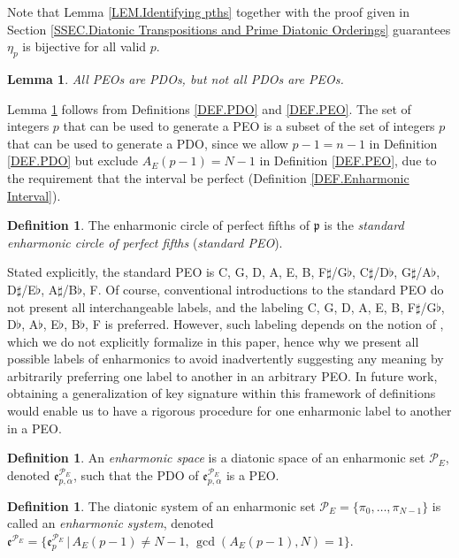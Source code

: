 \documentclass{article}
\theoremstyle{plain}
\newtheorem{lemma}[theorem]{Lemma}
\theoremstyle{definition}
\newtheorem{definition}[theorem]{Definition}
\theoremstyle{remark}
\begin{document}
Note that Lemma \ref{LEM.Identifying pths} together with the proof given in Section \ref{SSEC.Diatonic Transpositions and Prime Diatonic Orderings} guarantees $\eta_p$ is bijective for all valid $p$.

\begin{lemma}
\label{LEM.Not All PDOs are PEOs}
	All PEOs are PDOs, but not all PDOs are PEOs.
\end{lemma}

Lemma \ref{LEM.Not All PDOs are PEOs} follows from Definitions \ref{DEF.PDO} and \ref{DEF.PEO}. The set of integers $p$ that can be used to generate a PEO is a subset of the set of integers $p$ that can be used to generate a PDO, since we allow $p-1=n-1$ in Definition \ref{DEF.PDO} but exclude $A_E(p-1)=N-1$ in Definition \ref{DEF.PEO}, due to the requirement that the interval be perfect (Definition \ref{DEF.Enharmonic Interval}).

\begin{definition}
	The enharmonic circle of perfect fifths of $\mathfrak{p}$ is the \textit{standard enharmonic circle of perfect fifths} (\textit{standard PEO}).
\end{definition}

Stated explicitly, the standard PEO is C, G, D, A, E, B, F$\sharp$/G$\flat$, C$\sharp$/D$\flat$, G$\sharp$/A$\flat$, D$\sharp$/E$\flat$, A$\sharp$/B$\flat$, F. Of course, conventional introductions to the standard PEO do not present all interchangeable labels, and the labeling C, G, D, A, E, B, F$\sharp$/G$\flat$, D$\flat$, A$\flat$, E$\flat$, B$\flat$, F is preferred. However, such labeling depends on the notion of , which we do not explicitly formalize in this paper, hence why we present all possible labels of enharmonics to avoid inadvertently suggesting any meaning by arbitrarily preferring one label to another in an arbitrary PEO. In future work, obtaining a generalization of key signature within this framework of definitions would enable us to have a rigorous procedure for  one enharmonic label to another in a PEO.

\begin{definition}
	An \textit{enharmonic space} is a diatonic space of an enharmonic set $\mathcal{P}_E$, denoted $\mathfrak{e}_{p,\alpha}^{\mathcal{P}_E}$, such that the PDO of $\mathfrak{e}_{p,\alpha}^{\mathcal{P}_E}$ is a PEO.
\end{definition}

\begin{definition}
	The diatonic system of an enharmonic set $\mathcal{P}_E=\{\pi_0,\dots,\pi_{N-1}\}$ is called an \textit{enharmonic system}, denoted $\mathfrak{e}^{\mathcal{P}_E}=\{\mathfrak{e}_{p}^{\mathcal{P}_E}\,|\,A_E(p-1)\ne N-1,\,\gcd{(A_E(p-1),N)}=1\}$.
\end{definition}
\end{document}
